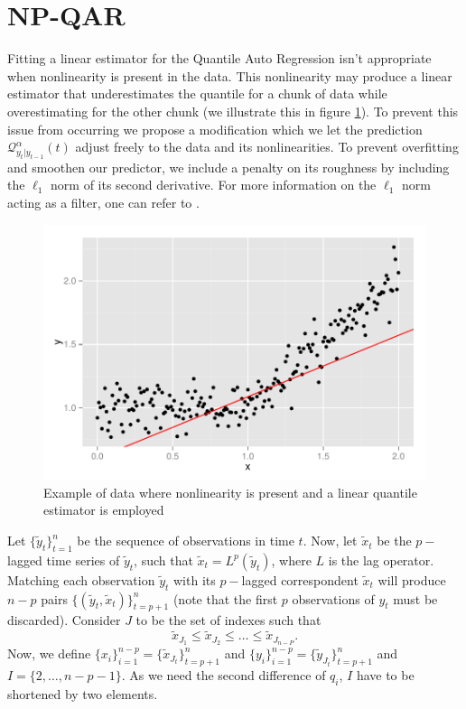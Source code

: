 \documentclass[a4paper]{IEEEtran}
\begin{document}
\section{NP-QAR}

Fitting a linear estimator for the Quantile Auto Regression isn't appropriate  when nonlinearity is present in the data. This nonlinearity may produce a linear estimator that underestimates the quantile for a chunk of data while overestimating for the other chunk (we illustrate this in figure \ref{fig:nonlinear}). To prevent this issue from occurring we propose a modification which we let the prediction $\mathcal{Q}_{y_t|y_{t-1}}^\alpha(t)$ adjust freely to the data and its nonlinearities. To prevent overfitting and smoothen our predictor, we include a penalty on its roughness by including the $\ell_1$ norm of its second derivative. For more information on the $\ell_1$ norm acting as a filter, one can refer to \cite{kim2009ell_1}.

\begin{figure}
\centering
\includegraphics[width=0.7\linewidth]{../Paper_IEEE/nonlinear}
\caption{Example of data where nonlinearity is present and a linear quantile estimator is employed}
\label{fig:nonlinear}
\end{figure}

Let $\{\tilde{y}_t \}_{t=1}^n$ be the sequence of observations in time $t$. Now, let $\tilde{x}_t$ be the $p-$lagged time series of $\tilde{y}_t$, such that $\tilde{x}_t = L^p(\tilde{y}_t)$, where $L$ is the lag operator. Matching each observation $\tilde{y}_t$ with its $p-$lagged correspondent $\tilde{x}_t$ will produce $n-p$ pairs $\{(\tilde{y}_t,\tilde{x}_t)\}_{t=p+1}^n$ (note that the first $p$ observations of $y_t$ must be discarded). Consider $J$ to be the set of indexes such that
$$\tilde{x}_{J_1} \leq \tilde{x}_{J_2} \leq \dots \leq \tilde{x}_{J_{n-P}}.$$ 
Now, we define $\{x_i\}_{i=1}^{n-p} = \{\tilde{x}_{J_t} \}_{t=p+1}^{n}$ and $\{y_i\}_{i=1}^{n-p} = \{\tilde{y}_{J_t} \}_{t=p+1}^{n}$ and $I = \{2,\dots, n-p-1\}$. As we need the second difference of $q_i$, $I$ have to be shortened by two elements.
\end{document}
